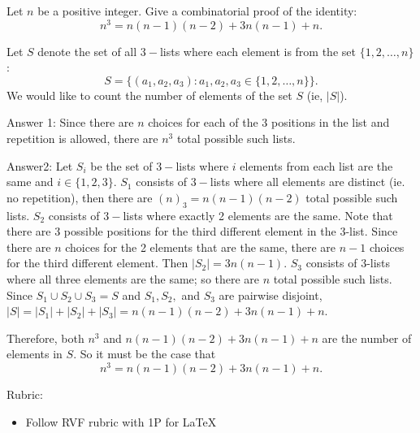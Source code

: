 \documentclass{article}
\theoremstyle{definition}
\begin{document}
\begin{question}
    Let $n$ be a positive integer.  Give a combinatorial proof of the identity:
    \[ n^3 = n(n-1)(n-2) + 3n(n-1) + n. \]
\end{question}
\begin{solution}
    Let $S$ denote the set of all $3-$lists where each element is from the set $\{1, 2, \dots, n\}$:
    \[S=\{(a_1, a_2, a_3): a_1, a_2, a_3\in \{1, 2, \dots, n\}\}.\]
    We would like to count the number of elements of the set $S$ (ie, $|S|$).
    
    Answer 1: Since there are $n$ choices for each of the 3 positions in the list and repetition is allowed, there are $n^3$ total possible such lists.
    
    Answer2: Let $S_i$ be the set of $3-$lists where $i$ elements from each list are the same and $i\in\{1, 2, 3\}$. $S_1$ consists of $3-$lists where all elements are distinct (ie. no repetition), then there are $(n)_3=n(n-1)(n-2)$ total possible such lists. $S_2$ consists of $3-$lists where exactly 2 elements are the same. Note that there are 3 possible positions for the third different element in the 3-list. Since there are $n$ choices for the 2 elements that are the same, there are $n-1$ choices for the third different element. Then $|S_2|=3n(n-1)$. $S_3$ consists of $3$-lists where all three elements are the same; so there are $n$ total possible such lists. Since $S_1\cup S_2\cup S_3=S$ and $S_1, S_2,$ and $S_3$ are pairwise disjoint, $|S| = |S_1|+|S_2|+|S_3|= n(n-1)(n-2)+3n(n-1)+n$.
    
    Therefore, both $n^3$ and $n(n-1)(n-2)+3n(n-1)+n$ are the number of elements in $S$. So it must be the case that
    \[n^3 = n(n-1)(n-2) + 3n(n-1) + n. \]
    
{\color{red} Rubric:
\begin{itemize}
\item Follow RVF rubric with 1P for \LaTeX
\end{itemize}}
\end{solution}
\end{document}
